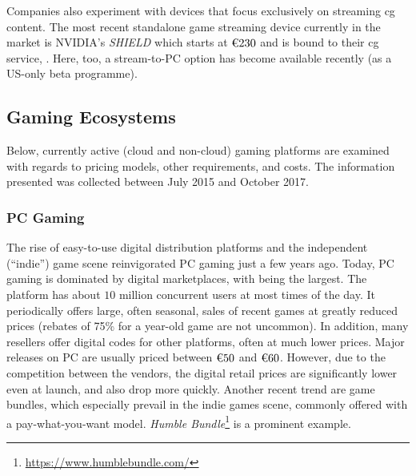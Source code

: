 Companies also experiment with devices that focus exclusively on streaming
\gls{cg} content. The most recent standalone game streaming device currently
in the market is NVIDIA's \textit{SHIELD} which starts at
$\text{\texteuro} 230$ and is bound to their \gls{cg} service, \gfnow.
Here, too, a stream-to-\gls{PC} option has become available recently
(as a US-only beta programme).



\subsection{Gaming Ecosystems}
Below, currently active (cloud and non-cloud) gaming platforms are examined
with regards to pricing models, other requirements, and costs. The
information presented was collected between July 2015 and October 2017.

\subsubsection{\gls{PC} Gaming}
\label{sec:pcgaming}

The rise of easy-to-use digital distribution platforms and the
independent (``indie'') game scene reinvigorated \gls{PC} gaming just a few
years ago. Today, \gls{PC} gaming is dominated by digital marketplaces,
with \steam being the largest. The platform has about $10$ million
concurrent users at most times of the day. It periodically offers large,
often seasonal, sales of recent games at greatly reduced prices (rebates
of 75\% for a year-old game are not uncommon). In addition, many
resellers offer digital codes for other platforms, often at much lower
prices.
Major releases on PC are usually priced between $\text{\texteuro} 50$
and $\text{\texteuro} 60$. However, due to the competition between the
vendors, the digital retail prices are significantly lower even at
launch, and also drop more quickly. Another recent trend are game
bundles, which especially prevail in the indie games scene, commonly
offered with a pay-what-you-want model. \textit{Humble
Bundle}\footnote{\url{https://www.humblebundle.com/}} is a prominent
example.

